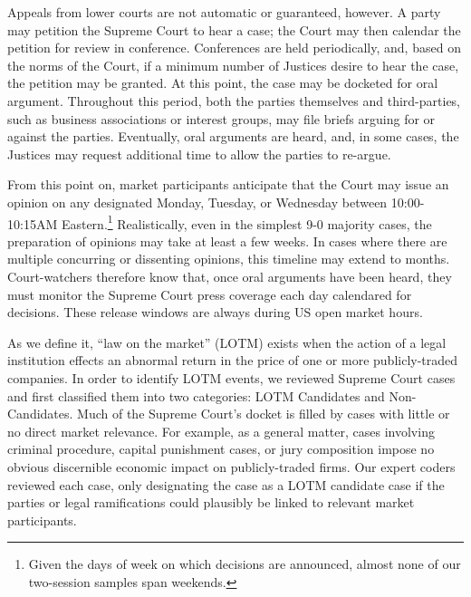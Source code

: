 \documentclass[preprint,12pt]{elsarticle}
\begin{document}
Appeals from lower courts are not automatic or guaranteed, however.  A party may petition the Supreme Court to hear a case; the Court may then calendar the petition for review in conference.  Conferences are held periodically, and, based on the norms of the Court, if a minimum number of Justices desire to hear the case, the petition may be granted.  At this point, the case may be docketed for oral argument.  Throughout this period, both the parties themselves and third-parties, such as business associations or interest groups, may file briefs arguing for or against the parties.  Eventually, oral arguments are heard, and, in some cases, the Justices may request additional time to allow the parties to re-argue.

From this point on, market participants anticipate that the Court may issue an opinion on any designated Monday, Tuesday, or Wednesday between 10:00-10:15AM Eastern.\footnote{Given the days of week on which decisions are announced, almost none of our two-session samples span weekends.}  Realistically, even in the simplest 9-0 majority cases, the preparation of opinions may take at least a few weeks.  In cases where there are multiple concurring or dissenting opinions, this timeline may extend to months.  Court-watchers therefore know that, once oral arguments have been heard, they must monitor the Supreme Court press coverage each day calendared for decisions.  These release windows are always during US open market hours.

As we define it, ``law on the market'' (LOTM) exists when the action of a legal institution effects an abnormal return in the price of one or more publicly-traded companies. In order to identify LOTM events, we reviewed Supreme Court cases and first classified them into two categories: LOTM Candidates and Non-Candidates.  Much of the Supreme Court's docket is filled by cases with little or no direct market relevance. For example, as a general matter, cases involving criminal procedure, capital punishment cases, or jury composition impose no obvious discernible economic impact on publicly-traded firms.  Our expert coders reviewed each case, only designating the case as a LOTM candidate case if the parties or legal ramifications could plausibly be linked to relevant market participants.  
\end{document}
